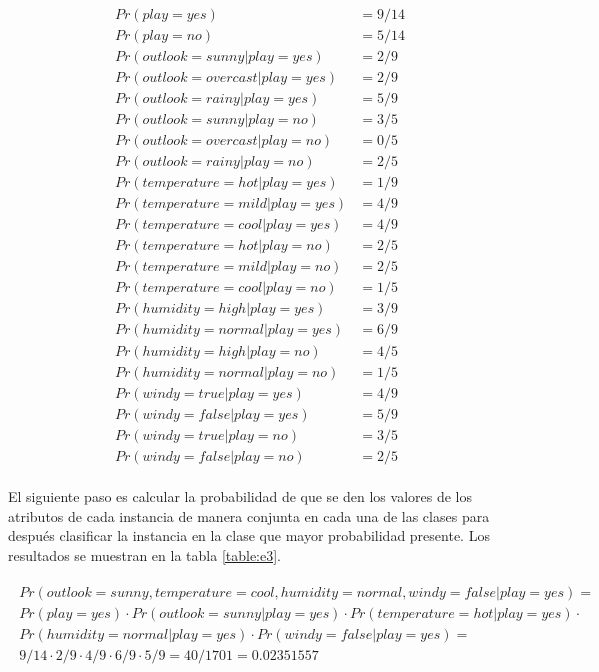 \documentclass{article}
\begin{document}
		\begin{align*}
			Pr(play = yes) &= 9/14 \\
			Pr(play = no) &= 5/14 \\
			Pr(outlook = sunny 		| play = yes) &= 2/9 \\
			Pr(outlook = overcast | play = yes) &= 2/9 \\
			Pr(outlook = rainy 		| play = yes) &= 5/9 \\
			Pr(outlook = sunny 		| play = no) &= 3/5 \\
			Pr(outlook = overcast | play = no) &= 0/5 \\
			Pr(outlook = rainy 		| play = no) &= 2/5 \\
			Pr(temperature = hot 	| play = yes) &= 1/9 \\
			Pr(temperature = mild | play = yes) &= 4/9 \\
			Pr(temperature = cool | play = yes) &= 4/9 \\
			Pr(temperature = hot 	| play = no) &= 2/5 \\
			Pr(temperature = mild | play = no) &= 2/5 \\
			Pr(temperature = cool | play = no) &= 1/5 \\
			Pr(humidity = high 		| play = yes) &= 3/9 \\
			Pr(humidity = normal 	| play = yes) &= 6/9 \\
			Pr(humidity = high		| play = no) &= 4/5 \\
			Pr(humidity = normal 	| play = no) &= 1/5 \\
			Pr(windy = true 			|	 play = yes) &= 4/9 \\
			Pr(windy = false 			| play = yes) &= 5/9 \\
			Pr(windy = true 			| play = no) &= 3/5 \\
			Pr(windy = false 			| play = no) &= 2/5
		\end{align*}

		\paragraph{}
		El siguiente paso es calcular la probabilidad de que se den los valores de los atributos de cada instancia de manera conjunta en cada una de las clases para después clasificar la instancia en la clase que mayor probabilidad presente. Los resultados se muestran en la tabla \ref{table:e3}.

		\begin{align}
		\label{eq:x1_probability_yes}
			\begin{split}
				Pr(outlook = sunny, temperature = cool, humidity = normal, windy = false | play = yes) = \\
				Pr(play = yes) \cdot Pr(outlook = sunny | play = yes) \cdot Pr(temperature = hot 	| play = yes) \cdot \\
				Pr(humidity = normal 	| play = yes) \cdot Pr(windy = false 	| play = yes) = \\
				9/14 \cdot 2/9 \cdot 4/9 \cdot 6/9 \cdot 5/9 = 40/1701 = 0.02351557
			\end{split}
		\end{align}
\end{document}
